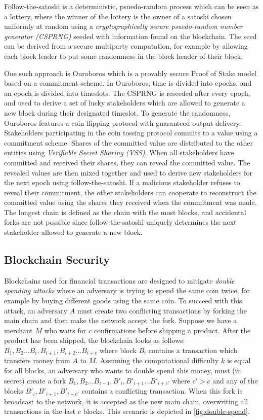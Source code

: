 \documentclass{style/kththesis}
\begin{document}
Follow-the-satoshi is a deterministic, psuedo-random process which can be seen as a lottery, where the winner of the lottery is the owner of a satoshi chosen uniformly at random using a \emph{cryptographically secure psuedo-random number generator (CSPRNG)} seeded with information found on the blockchain. The seed can be derived from a secure multiparty computation, for example by allowing each block leader to put some randomness in the block header of their block.

One such approach is Ouroboros \cite{Kiayias16} which is a provably secure Proof of Stake model based on a commitment scheme. In Ouroboros, time is divided into epochs, and an epoch is divided into timeslots. The CSPRNG is reseeded after every epoch, and used to derive a set of lucky stakeholders which are allowed to generate a new block during their designated timeslot. To generate the randomness, Ouroboros features a coin flipping protocol with guaranteed output delivery. Stakeholders participating in the coin tossing protocol commits to a value using a commitment scheme. Shares of the committed value are distributed to the other entities using \emph{Verifiable Secret Sharing (VSS)}. When all stakeholders have committed and received their shares, they can reveal the committed value. The revealed values are then mixed together and used to derive new stakeholders for the next epoch using follow-the-satoshi. If a malicious stakeholder refuses to reveal their commitment, the other stakeholders can cooperate to reconstruct the committed value using the shares they received when the commitment was made. The longest chain is defined as the chain with the most blocks, and accidental forks are not possible since follow-the-satoshi uniquely determines the next stakeholder allowed to generate a new block.

\subsection{Blockchain Security}
\label{blockchain-sec}
Blockchains used for financial transactions are designed to mitigate \emph{double spending attacks} where an adversary is trying to spend the same coin twice, for example by buying different goods using the same coin. To succeed with this attack, an adversary $A$ must create two conflicting transactions by forking the main chain and then make the network accept the fork. Suppose we have a merchant $M$ who waits for $c$ confirmations before shipping a product. After the product has been shipped, the blockchain looks as follows: $B_1, B_2\ldots B_i, B_{i+1}, B_{i+2}\ldots B_{i+c}$ where block $B_i$ contains a transaction which transfers money from $A$ to $M$. Assuming the computational difficulty $k$ is equal for all blocks, an adversary who wants to double spend this money, must (in secret) create a fork $B_1, B_2\ldots B_{i-1}, B'_{i}, B'_{i+1}\ldots B'_{i+c'}$ where $c' > c$ and any of the blocks $B'_{i}, B'_{i+1}, B'_{i+c'}$ contains a conflicting transaction. When this fork is broadcast to the network, it is accepted as the new main chain, overwriting all transactions in the last $c$ blocks. This scenario is depicted in \cref{fig:double-spend}.
\end{document}
